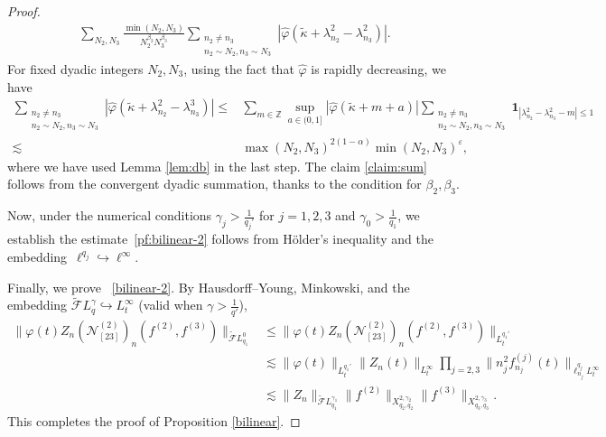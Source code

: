 \documentclass[11pt,reqno,english]{amsart}
\numberwithin{equation}{section}
\theoremstyle{plain}
\theoremstyle{definition}
\theoremstyle{remark}
\renewcommand{\epsilon}{\varepsilon}
\newcommand{\Z}{\mathbb{Z}}
\begin{document}
\begin{proof}
\begin{align*}
\sum_{N_2,N_3}\frac{\min(N_2,N_3)}{N_2^{\beta_2}N_3^{\beta_3}}\sum_{\substack{n_2\neq n_3\\
n_2\sim N_2, 
n_3\sim N_3 } } |\widehat{\varphi}(\widetilde{\kappa}+\lambda_{n_2}^2-\lambda_{n_3}^2)|.
\end{align*}
For fixed dyadic integers $N_2,N_3$, using the fact that $\widehat{\varphi}$ is rapidly decreasing, we have
\begin{align*}
\sum_{\substack{n_2\neq n_3\\
n_2\sim N_2, n_3\sim N_3
} }|\widehat{\varphi}(\widetilde{\kappa}+\lambda_{n_2}^2-\lambda_{n_3}^3)|\leq & \sum_{m\in \Z}\sup_{a\in (0,1]}|\widehat{\varphi}(\widetilde{\kappa}+m+a)|\sum_{\substack{n_2\neq n_3\\
n_2\sim N_2, n_3\sim N_3
 } }\mathbf{1}_{|\lambda_{n_2}^2-\lambda_{n_3}^2-m|\leq 1}\\
\lesssim & \max(N_2,N_3)^{2(1-\alpha)}\min(N_2,N_3)^{\epsilon},
\end{align*}
where we have used Lemma \ref{lem:db} in the last step. The claim \ref{claim:sum} follows from the convergent dyadic summation, thanks to the condition for $\beta_2,\beta_3$.

Now, under the numerical conditions $\gamma_j>\frac{1}{q_j'}$ for $j=1,2,3$ and $\gamma_0>\frac{1}{q_1}$, we establish the estimate~\eqref{pf:bilinear-2} follows from H\"older's inequality and the embedding~$\ell^{q_j}\hookrightarrow \ell^{\infty}$.
\medskip

Finally, we prove ~\eqref{bilinear-2}. By Hausdorff--Young, Minkowski, and the embedding $\widetilde{\mathcal{F}}L_q^{\gamma}\hookrightarrow L_t^{\infty}$ (valid when $\gamma>\frac{1}{q'}$),
	\begin{align*}
		\|\varphi(t)Z_n(\mathcal{N}_{[23]}^{(2)})_{n}(f^{(2)},f^{(3)}) \|_{\widetilde{\mathcal{F}}L_{q_1}^0}&\leq \|\varphi(t)Z_n(\mathcal{N}_{[23]}^{(2)})_{n}(f^{(2)},f^{(3)}) \|_{L_t^{q_1'}}\\
		&\lesssim \|\varphi(t)\|_{L_t^{q_1'}}\|Z_n(t)\|_{L_t^{\infty}}\prod_{j=2,3}\|n_j^2 f_{n_j}^{(j)}(t)\|_{\ell_{n_j}^{q_j}L_t^{\infty}}\\
		&\lesssim \|Z_n\|_{\widetilde{\mathcal{F}}L_{q_1}^{\gamma_1}}\|f^{(2)}\|_{X_{q_2,q_2}^{2,\gamma_2}}\|f^{(3)}\|_{X_{q_3,q_3}^{2,\gamma_3}}.
	\end{align*}
	This completes the proof of Proposition \ref{bilinear}.
\end{proof}
\end{document}
